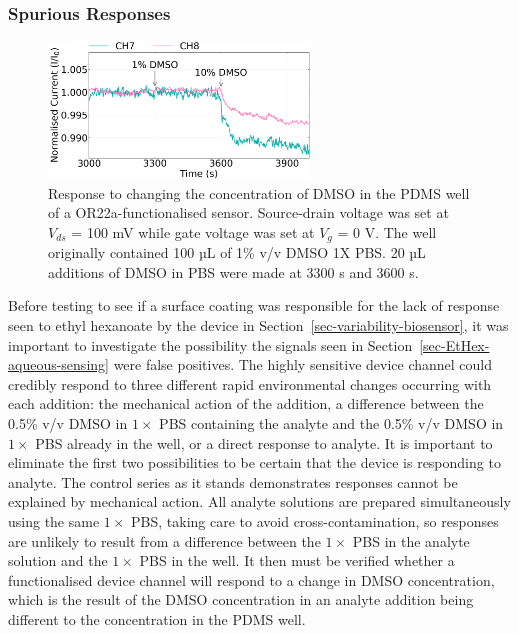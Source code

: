 \documentclass[
  a4paper,
]{scrbook}
\begin{document}
\hypertarget{spurious-responses}{%
\subsubsection*{Spurious Responses}\label{spurious-responses}}

\begin{figure}

{\centering \includegraphics[width=0.62\textwidth,height=\textheight]{figures/ch7/NGW4_D7_OR22aliposome_sampling_220623_detrend_trunc_arrows_normalised.png}

}

\caption{\label{fig-DMSO-concentration}Response to changing the
concentration of DMSO in the PDMS well of a OR22a-functionalised sensor.
Source-drain voltage was set at \(V_{ds}\) = 100 mV while gate voltage
was set at \(V_g\) = 0 V. The well originally contained 100 µL of 1\%
v/v DMSO 1X PBS. 20 µL additions of DMSO in PBS were made at 3300 s and
3600 s.}

\end{figure}

Before testing to see if a surface coating was responsible for the lack
of response seen to ethyl hexanoate by the device in
Section~\ref{sec-variability-biosensor}, it was important to investigate
the possibility the signals seen in
Section~\ref{sec-EtHex-aqueous-sensing} were false positives. The highly
sensitive device channel could credibly respond to three different rapid
environmental changes occurring with each addition: the mechanical
action of the addition, a difference between the 0.5\% v/v DMSO in
\(1 \times\) PBS containing the analyte and the 0.5\% v/v DMSO in
\(1 \times\) PBS already in the well, or a direct response to analyte.
It is important to eliminate the first two possibilities to be certain
that the device is responding to analyte. The control series as it
stands demonstrates responses cannot be explained by mechanical action.
All analyte solutions are prepared simultaneously using the same
\(1 \times\) PBS, taking care to avoid cross-contamination, so responses
are unlikely to result from a difference between the \(1 \times\) PBS in
the analyte solution and the \(1 \times\) PBS in the well. It then must
be verified whether a functionalised device channel will respond to a
change in DMSO concentration, which is the result of the DMSO
concentration in an analyte addition being different to the
concentration in the PDMS well.
\end{document}
